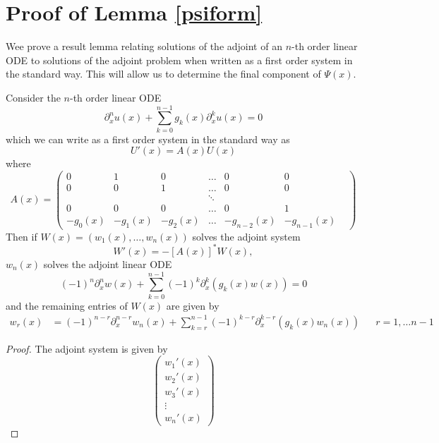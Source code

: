 \documentclass[thesis.tex]{subfiles}
\begin{document}
\section{Proof of Lemma \ref{psiform}}

Wee prove a result lemma relating solutions of the adjoint of an $n$-th order linear ODE to solutions of the adjoint problem when written as a first order system in the standard way. This will allow us to determine the final component of $\Psi(x)$.

\begin{lemma}\label{adjointlemma}
Consider the $n$-th order linear ODE 
\begin{equation}\label{linODE}
\partial_x^n u(x) + \sum_{k=0}^{n-1}g_k(x) \partial_x^k u(x) = 0
\end{equation}
which we can write as a first order system in the standard way as
\begin{equation}\label{linODEsys}
U'(x) = A(x)U(x)
\end{equation}
where
\begin{equation}\label{Axform}
A(x) = \begin{pmatrix}
0 & 1 & 0 & \dots & 0 & 0 \\
0 & 0 & 1 & \dots & 0 & 0 \\
& &  & \ddots &  & & \\
0 & 0 & 0 & \dots & 0 & 1 \\
-g_0(x) & -g_1(x) & -g_2(x) &
 \dots & -g_{n-2}(x) & -g_{n-1}(x)
\end{pmatrix}
\end{equation}
Then if $W(x) = (w_1(x), \dots, w_n(x))$ solves the adjoint system
\begin{equation}\label{adjODEsys}
W'(x) = -[A(x)]^* W(x),
\end{equation}
$w_n(x)$ solves the adjoint linear ODE
\begin{equation}\label{adjODE}
(-1)^n \partial_x^n w(x) + \sum_{k=0}^{n-1} (-1)^k \partial_x^k( g_k(x) w(x)) = 0
\end{equation}
and the remaining entries of $W(x)$ are given by
\begin{align}\label{adjWform}
w_r(x) &= (-1)^{n-r} \partial_x^{n-r}w_n(x) + \sum_{k=r}^{n-1} (-1)^{k-r} \partial_x^{k-r}(g_k(x) w_n(x)) && r = 1, \dots n-1
\end{align}
\begin{proof}
The adjoint system is given by
\begin{equation*}
\begin{pmatrix}
w_1'(x) \\ w_2'(x) \\ w_3'(x) \\ \vdots \\ w_n'(x)

\end{pmatrix}
\end{equation*}
\end{proof}
\end{lemma}
\end{document}
